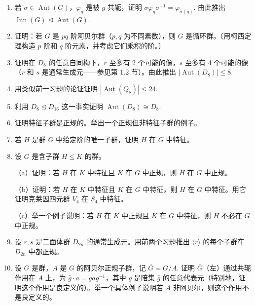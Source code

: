 \begin{enumerate}
\item 若 \(\sigma \in \operatorname{Aut}(G)\)，\(\varphi_g\) 是被 \(g\) 共轭，证明 \(\sigma\varphi_g\sigma^{-1} = \varphi_{\sigma(g)}\). 由此推出 \(\operatorname{Inn}(G) \trianglelefteq \operatorname{Aut}(G)\).

\item 证明：若 \(G\) 是 \(pq\) 阶阿贝尔群（\(p, q\) 为不同素数），则 \(G\) 是循环群。〔用柯西定理构造 \(p\) 阶和 \(q\) 阶元素，并考虑它们乘积的阶。〕

\item 证明在 \(D_8\) 的任意自同构下，\(r\) 至多有 2 个可能的像，\(s\) 至多有 4 个可能的像（\(r\) 和 \(s\) 是通常生成元——参见第 1.2 节）。由此推出 \(|\operatorname{Aut}(D_8)| \leq 8\).

\item 用类似前一习题的论证证明 \(|\operatorname{Aut}(Q_8)| \leq 24\).

\item 利用 \(D_8 \trianglelefteq D_{16}\) 这一事实证明 \(\operatorname{Aut}(D_8) \cong D_8\).

\item 证明特征子群是正规的。举出一个正规但非特征子群的例子。

\item 若 \(H\) 是群 \(G\) 中给定阶的唯一子群，证明 \(H\) 在 \(G\) 中特征。

\item 设 \(G\) 是含子群 \(H \leq K\) 的群。

（a）证明：若 \(H\) 在 \(K\) 中特征且 \(K\) 在 \(G\) 中正规，则 \(H\) 在 \(G\) 中正规。

（b）证明：若 \(H\) 在 \(K\) 中特征且 \(K\) 在 \(G\) 中特征，则 \(H\) 在 \(G\) 中特征。用它证明克莱因四元群 \(V_4\) 在 \(S_4\) 中特征。

（c）举一个例子说明：若 \(H\) 在 \(K\) 中正规且 \(K\) 在 \(G\) 中特征，则 \(H\) 不必在 \(G\) 中正规。

\item 设 \(r, s\) 是二面体群 \(D_{2n}\) 的通常生成元。用前两个习题推出 \(\langle r \rangle\) 的每个子群在 \(D_{2n}\) 中都正规。

\item 设 \(G\) 是群，\(A\) 是 \(G\) 的阿贝尔正规子群，记 \(\bar{G} = G/A\). 证明 \(\bar{G}\)（左）通过共轭作用在 \(A\) 上，为 \(\bar{g} \cdot a = gag^{-1}\)，其中 \(g\) 是陪集 \(\bar{g}\) 的任意代表元（特别地，证明这个作用是良定义的）。举一个具体例子说明若 \(A\) 非阿贝尔，则这个作用不是良定义的。


\end{enumerate}

